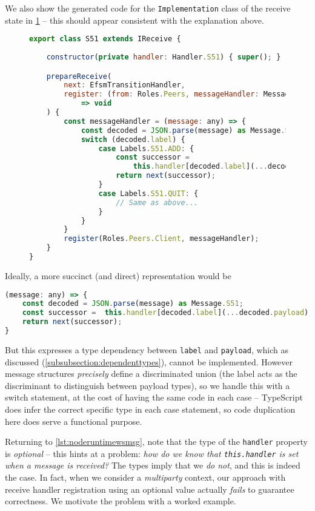 We also show the generated code for the \texttt{Implementation}
class of the receive state in \cref{lst:nodereceive}
-- this should appear consistent
with the explanation above.

\begin{figure}[!h]
\begin{lstlisting}[language=javascript,tabsize=2]
export class S51 extends IReceive {
	
	constructor(private handler: Handler.S51) { super(); }

	prepareReceive(
		next: EfsmTransitionHandler,
		register: (from: Roles.Peers, messageHandler: MessageHandler)
			=> void
	) {
		const messageHandler = (message: any) => {
			const decoded = JSON.parse(message) as Message.S51;
			switch (decoded.label) {
				case Labels.S51.ADD: {
					const successor = 
						this.handler[decoded.label](...decoded.payload);
					return next(successor);
				}
				case Labels.S51.QUIT: {
					// Same as above...		
				}
			}            
		}
		register(Roles.Peers.Client, messageHandler);
	}
}
\end{lstlisting}
\label{lst:nodereceive}
\end{figure}

Ideally, a more succinct (and direct) representation would be
\begin{lstlisting}[language=javascript,tabsize=2]
(message: any) => {
	const decoded = JSON.parse(message) as Message.S51;
	const successor =  this.handler[decoded.label](...decoded.payload);
	return next(successor);
}
\end{lstlisting}

But this expresses a type dependency between \texttt{label}
and \texttt{payload}, which as discussed 
(\cref{subsubsection:dependenttypes}), cannot be implemented.
However message structures \textit{precisely} 
define a discriminated union 
(the label acts as the discriminant 
to distinguish between payload types),
so we handle this with a switch statement,
at the cost of having the same code in each case --
TypeScript does infer the correct specific type in each case statement,
so code duplication here does serve a functional purpose.

Returning to \cref{lst:noderuntimewsmsg},
note that the type of the \texttt{handler} property is \textit{optional}
-- this hints at a problem: 
\textit{how do we know that \texttt{this.handler} is set when
a message is received?} The types imply that we \textit{do not},
and this is indeed the case.
In fact, when we consider a \textit{multiparty} context,
our approach with receive handler registration 
using an optional value actually \textit{fails} to guarantee correctness.
We motivate the problem with a worked
example.

